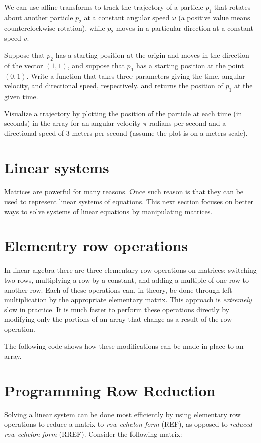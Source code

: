 \begin{problem}
We can use affine transforms to track the trajectory of a particle $p_1$ that rotates about another particle $p_2$ at a constant angular speed $\omega$ (a positive value means counterclockwise rotation), while $p_2$ moves in a particular direction at a constant speed $v$. 

Suppose that $p_2$ has a starting position at the origin and moves in the direction of the vector $(1, 1)$, and suppose that $p_1$ has a starting position at the point $(0,1)$. Write a function that takes three parameters giving the time, angular velocity, and directional speed, respectively, and returns the position of $p_1$ at the given  time.

Visualize a trajectory by plotting the position of the particle at each time (in seconds) in the array  for an angular velocity $\pi$ radians per second and a directional speed of 3 meters per second (assume the plot is on a meters scale).
\end{problem}

\section*{Linear systems}
Matrices are powerful for many reasons. Once such reason is that they can be used to represent linear systems of equations. This next section focuses on better ways to solve systems of linear equations by manipulating matrices.

\section*{Elementry row operations}
In linear algebra there are three elementary row operations on matrices: switching two rows, multiplying a row by a constant, and adding a multiple of one row to another row. Each of these operations can, in theory, be done through left multiplication by the appropriate elementary matrix. This approach is \emph{extremely} slow in practice.
It is much faster to perform these operations directly by modifying only the portions of an array that change as a result of the row operation.


The following code shows how these modifications can be made in-place to an array.


\section*{Programming Row Reduction}
Solving a linear system can be done most efficiently by using elementary row operations to reduce a matrix to \emph{row echelon form} (REF), as opposed to \emph{reduced row echelon form} (RREF).
Consider the following matrix:

